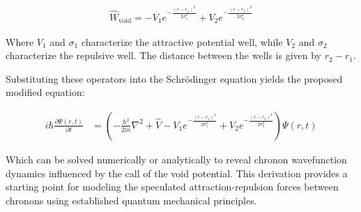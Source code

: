 \documentclass{article}
\begin{document}
\begin{align*}
\hat{W}_{\text{void}} = -V_1 e^{-\frac{(r-r_1)^2}{2\sigma_1^2}} + V_2 e^{-\frac{(r-r_2)^2}{2\sigma_2^2}} 
\end{align*}

Where $V_1$ and $\sigma_1$ characterize the attractive potential well, while $V_2$ and $\sigma_2$ characterize the repulsive well. The distance between the wells is given by $r_2 - r_1$.

Substituting these operators into the Schrödinger equation yields the proposed modified equation:

\begin{align*}
i\hbar\frac{\partial \Psi(r,t)}{\partial t} &= \left(-\frac{\hbar^2}{2m}\nabla^2 + \hat{V} -V_1 e^{-\frac{(r-r_1)^2}{2\sigma_1^2}} + V_2 e^{-\frac{(r-r_2)^2}{2\sigma_2^2}} \right)\Psi(r,t)
\end{align*}

Which can be solved numerically or analytically to reveal chronon wavefunction dynamics influenced by the call of the void potential. This derivation provides a starting point for modeling the speculated attraction-repulsion forces between chronons using established quantum mechanical principles.
\end{document}
